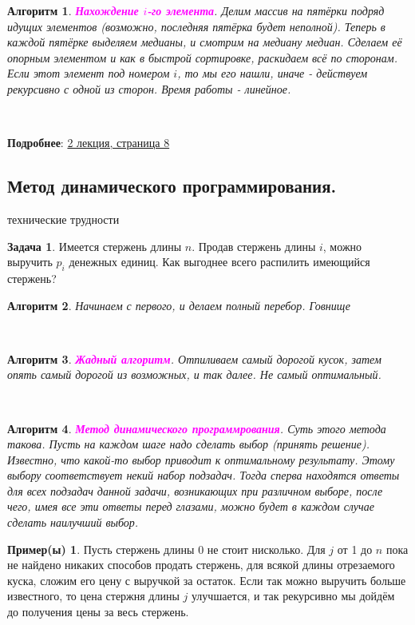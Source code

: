 \documentclass[a4paper]{article}
\theoremstyle{indented}
\newtheorem{alg}{Алгоритм}
\theoremstyle{definition}
\newtheorem{exl}{Пример(ы)}
\newtheorem{prob}{Задача}
\theoremstyle{remark}
\begin{document}
\begin{alg}
    \textcolor{magenta}{\hypertarget{t5}{\textbf{Нахождение $i$-го элемента}}}. Делим массив на пятёрки подряд идущих элементов (возможно, последняя пятёрка будет неполной). Теперь в каждой пятёрке выделяем медианы, и смотрим на медиану медиан. Сделаем её опорным элементом и как в быстрой сортировке, раскидаем всё по сторонам. Если этот элемент под номером $i$, то мы его нашли, иначе - действуем рекурсивно с одной из сторон. Время работы - линейное.
\end{alg} \

\textbf{Подробнее}: \href{https://users.math-cs.spbu.ru/~okhotin/teaching/algorithms_2020/okhotin_algorithms_2020_l2.pdf}{2 лекция, страница 8}

\subsection{Метод динамического программирования.}

\hypertarget{e1}{технические трудности}

\begin{prob}
    Имеется стержень длины $n$. Продав стержень длины $i$, можно выручить $p_i$ денежных единиц. Как выгоднее всего распилить имеющийся стержень?
\end{prob}

\begin{alg}
    Начинаем с первого, и делаем полный перебор. Говнище
\end{alg} \ 

\begin{alg}
    \textcolor{magenta}{\hypertarget{t6}{\textbf{Жадный алгоритм}}}. Отпиливаем самый дорогой кусок, затем опять самый дорогой из возможных, и так далее. Не самый оптимальный.
\end{alg} \ 

\begin{alg}
    \textcolor{magenta}{\hypertarget{t7}{\textbf{Метод динамического программрования}}}. Суть этого метода такова. Пусть на каждом шаге надо сделать выбор (принять решение). Известно, что какой-то выбор приводит к оптимальному результату. Этому выбору соответствует некий набор подзадач. Тогда сперва находятся ответы для всех подзадач данной задачи, возникающих при различном выборе, после чего, имея все эти ответы перед глазами, можно будет в каждом случае сделать наилучший выбор.
\end{alg}

\begin{exl}
    Пусть стержень длины 0 не стоит нисколько. Для $j$ от 1 до $n$ пока не найдено никаких способов продать стержень, для всякой длины отрезаемого куска, сложим его цену с выручкой за остаток. Если так можно выручить больше известного, то цена стержня длины $j$ улучшается, и так рекурсивно мы дойдём до получения цены за весь стержень. 
\end{exl}
\end{document}
